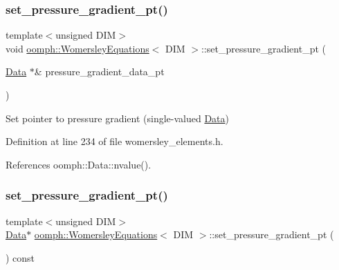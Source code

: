 \subsubsection{\texorpdfstring{set\+\_\+pressure\+\_\+gradient\+\_\+pt()}{set\_pressure\_gradient\_pt()}\hspace{0.1cm}{\footnotesize\ttfamily [1/2]}}
{\footnotesize\ttfamily template$<$unsigned D\+IM$>$ \\
void \hyperlink{classoomph_1_1WomersleyEquations}{oomph\+::\+Womersley\+Equations}$<$ D\+IM $>$\+::set\+\_\+pressure\+\_\+gradient\+\_\+pt (\begin{DoxyParamCaption}\item[{\hyperlink{classoomph_1_1Data}{Data} $\ast$\&}]{pressure\+\_\+gradient\+\_\+data\+\_\+pt }\end{DoxyParamCaption})\hspace{0.3cm}{\ttfamily [inline]}}



Set pointer to pressure gradient (single-\/valued \hyperlink{classoomph_1_1Data}{Data}) 



Definition at line 234 of file womersley\+\_\+elements.\+h.



References oomph\+::\+Data\+::nvalue().

\mbox{\label{classoomph_1_1WomersleyEquations_a72c6fc82b100bd997a6d707d8bccd9d2}} 
\subsubsection{\texorpdfstring{set\+\_\+pressure\+\_\+gradient\+\_\+pt()}{set\_pressure\_gradient\_pt()}\hspace{0.1cm}{\footnotesize\ttfamily [2/2]}}
{\footnotesize\ttfamily template$<$unsigned D\+IM$>$ \\
\hyperlink{classoomph_1_1Data}{Data}$\ast$ \hyperlink{classoomph_1_1WomersleyEquations}{oomph\+::\+Womersley\+Equations}$<$ D\+IM $>$\+::set\+\_\+pressure\+\_\+gradient\+\_\+pt (\begin{DoxyParamCaption}{ }\end{DoxyParamCaption}) const\hspace{0.3cm}{\ttfamily [inline]}}



